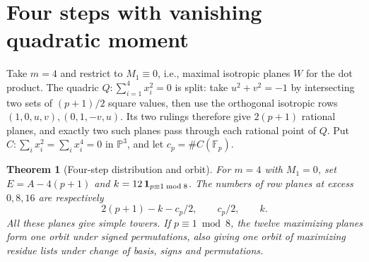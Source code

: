 \documentclass[11pt]{article}
\newtheorem{theorem}{Theorem}
\newcommand{\F}{\mathbb F}
\newcommand{\PP}{\mathbb P}
\begin{document}
\section{Four steps with vanishing quadratic moment}
Take $m=4$ and restrict to $M_1\equiv0$, i.e., maximal isotropic
planes $W$ for the dot product. The quadric
$Q:\sum_{i=1}^4 x_i^2=0$ is split: take $u^2+v^2=-1$ by
intersecting two sets of $(p+1)/2$ square values, then use the
orthogonal isotropic rows $(1,0,u,v),(0,1,-v,u)$. Its two rulings
therefore give $2(p+1)$ rational planes, and exactly two such
planes pass through each rational point of $Q$.
Put $C:\sum_i x_i^2=\sum_i x_i^4=0$ in $\PP^3$, and let
$c_p=\#C(\F_p)$.

\begin{theorem}[Four-step distribution and orbit]
For $m=4$ with $M_1=0$, set $E=A-4(p+1)$ and
$k=12\,{\bf 1}_{p\equiv1\bmod8}$. The numbers of row planes
at excess $0,8,16$ are respectively
\[
    2(p+1)-k-c_p/2,\qquad c_p/2,\qquad k.
\]
All these planes give simple towers. If $p\equiv1\bmod8$,
the twelve maximizing planes form one orbit under signed
permutations, also giving one orbit of maximizing residue
lists under change of basis, signs and permutations.
\end{theorem}
\end{document}
